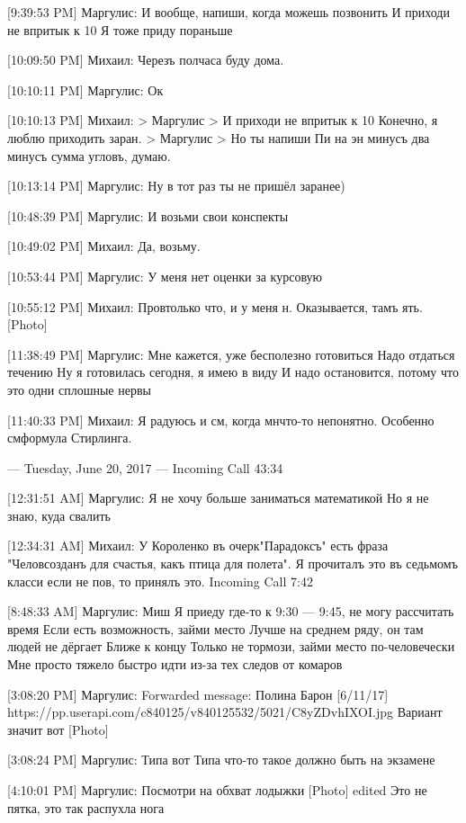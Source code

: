 \documentclass{article}
\newcommand{\yat}{{\fontencoding{X2}\selectfont\cyryat}} %
\begin{document}
[9:39:53 PM] Маргулис:
И вообще, напиши, когда можешь позвонить
 И приходи не впритык к 10
 Я тоже приду пораньше

[10:09:50 PM] Михаил:
Черезъ полчаса буду дома.

[10:10:11 PM] Маргулис:
Ок

[10:10:13 PM] Михаил:
> Маргулис
> И приходи не впритык к 10
Конечно, я люблю приходить заран.
> Маргулис
> Но ты напиши
Пи на эн минусъ два минусъ сумма угловъ, думаю.

[10:13:14 PM] Маргулис:
Ну в тот раз ты не пришёл заранее)

[10:48:39 PM] Маргулис:
И возьми свои конспекты

[10:49:02 PM] Михаил:
Да, возьму.

[10:53:44 PM] Маргулис:
У меня нет оценки за курсовую

[10:55:12 PM] Михаил:
Пров только что, и у меня н.
 Оказывается, тамъ ять.
 [Photo]

[11:38:49 PM] Маргулис:
Мне кажется, уже бесполезно готовиться
 Надо отдаться течению
 Ну я готовилась сегодня, я имею в виду
 И надо остановится, потому что это одни сплошные нервы

[11:40:33 PM] Михаил:
Я радуюсь и см, когда мн\yat что-то непонятно.
 Особенно см формула Стирлинга.

--- Tuesday, June 20, 2017 ---
Incoming Call 43:34

[12:31:51 AM] Маргулис:
Я не хочу больше заниматься математикой
 Но я не знаю, куда свалить

[12:34:31 AM] Михаил:
У Короленко въ очерк\yat "Парадоксъ" есть фраза "Челов созданъ для счастья, какъ птица для полета". Я прочиталъ это въ седьмомъ класс\yat и если не пов, то принялъ это.
Incoming Call 7:42

[8:48:33 AM] Маргулис:
Миш
 Я приеду где-то к 9:30 — 9:45, не могу рассчитать время
 Если есть возможность, займи место
 Лучше на среднем ряду, он там людей не дёргает
 Ближе к концу
 Только не тормози, займи место по-человечески
 Мне просто тяжело быстро идти из-за тех следов от комаров

[3:08:20 PM] Маргулис:
Forwarded message: 
Полина Барон [6/11/17] 
https://pp.userapi.com/c840125/v840125532/5021/C8yZDvhIXOI.jpg 
Вариант значит вот
 [Photo]

[3:08:24 PM] Маргулис:
Типа вот
 Типа что-то такое должно быть на экзамене

[4:10:01 PM] Маргулис:
Посмотри на обхват лодыжки
 [Photo]
edited 
Это не пятка, это так распухла нога
\end{document}
